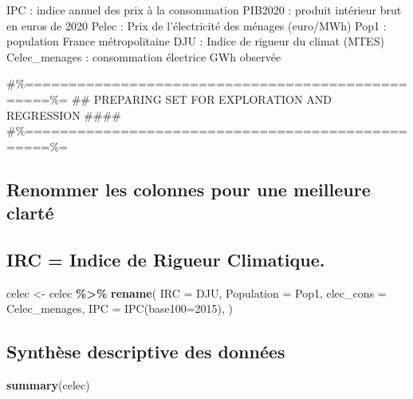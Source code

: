 \documentclass[
]{article}
\newenvironment{Shaded}{\begin{snugshade}}{\end{snugshade}}
\newcommand{\AttributeTok}[1]{\textcolor[rgb]{0.13,0.29,0.53}{#1}}
\newcommand{\FunctionTok}[1]{\textcolor[rgb]{0.13,0.29,0.53}{\textbf{#1}}}
\newcommand{\NormalTok}[1]{#1}
\newcommand{\OtherTok}[1]{\textcolor[rgb]{0.56,0.35,0.01}{#1}}
\newcommand{\SpecialCharTok}[1]{\textcolor[rgb]{0.81,0.36,0.00}{\textbf{#1}}}
\newcommand{\StringTok}[1]{\textcolor[rgb]{0.31,0.60,0.02}{#1}}
\begin{document}
IPC : indice annuel des prix à la consommation PIB2020 : produit
intérieur brut en euros de 2020 Pelec : Prix de l'électricité des
ménages (euro/MWh) Pop1 : population France métropolitaine DJU : Indice
de rigueur du climat (MTES) Celec\_menages : consommation électrice GWh
observée

\#\%=================================================\%= \#\# PREPARING
SET FOR EXPLORATION AND REGRESSION \#\#\#\#
\#\%=================================================\%=

\subsection{Renommer les colonnes pour une meilleure
clarté}\label{renommer-les-colonnes-pour-une-meilleure-clartuxe9}

\subsection{IRC = Indice de Rigueur
Climatique.}\label{irc-indice-de-rigueur-climatique.}

\begin{Shaded}
\begin{Highlighting}[]
\NormalTok{ celec }\OtherTok{\textless{}{-}}\NormalTok{ celec }\SpecialCharTok{\%\textgreater{}\%}
  \FunctionTok{rename}\NormalTok{(}
        \AttributeTok{IRC =}\NormalTok{ DJU,}
        \AttributeTok{Population =}\NormalTok{ Pop1,}
        \AttributeTok{elec\_cons =}\NormalTok{ Celec\_menages,}
        \AttributeTok{IPC =} \StringTok{\textasciigrave{}}\AttributeTok{IPC(base100=2015)}\StringTok{\textasciigrave{}}\NormalTok{,}
\NormalTok{    )}
\end{Highlighting}
\end{Shaded}

\subsection{Synthèse descriptive des
données}\label{synthuxe8se-descriptive-des-donnuxe9es}

\begin{Shaded}
\begin{Highlighting}[]
\FunctionTok{summary}\NormalTok{(celec)}
\end{Highlighting}
\end{Shaded}
\end{document}
